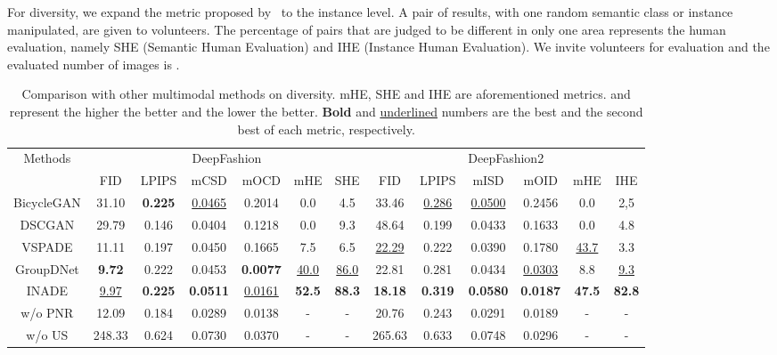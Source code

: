 \documentclass[final]{cvpr}
\begin{document}
For diversity, we expand the metric proposed by~\cite{zhu2020semantically} to the instance level. A pair of results, with one random semantic class or instance manipulated, are given to volunteers. The percentage of pairs that are judged to be different in only one area represents the human evaluation, namely SHE (Semantic Human Evaluation) and IHE (Instance Human Evaluation). We invite  volunteers for evaluation and the evaluated number of images is .


\begin{table*}[t]
\setlength{\tabcolsep}{1.6mm}
    \centering
    \caption{Comparison with other multimodal methods on diversity. mHE, SHE and IHE are aforementioned metrics.
     and  represent the higher the better and the lower the better. \textbf{Bold} and \underline{underlined} numbers are the best and the second best of each metric, respectively.}
    \small
    \begin{tabular}{c|c|c|c|c|c|c|c|c|c|c|c|c}
    \hline
        \multirow{2}{*}{Methods} & \multicolumn{6}{c|}{DeepFashion} & \multicolumn{6}{c}{DeepFashion2}\\
        \cline{2-13}
         & FID  & LPIPS  & mCSD  & mOCD  & mHE  & SHE  & FID  & LPIPS  & mISD  & mOID  & mHE  & IHE \\
        \hline
        BicycleGAN & 31.10 & \textbf{0.225} & \underline{0.0465} & 0.2014 & 0.0 & 4.5 & 33.46 & \underline{0.286} & \underline{0.0500} & 0.2456 & 0.0 & 2,5\\
        \hline
        DSCGAN & 29.79 & 0.146 & 0.0404 & 0.1218 & 0.0 & 9.3 & 48.64 & 0.199 & 0.0433 & 0.1633 & 0.0 & 4.8\\
        \hline
        VSPADE & 11.11 & 0.197 & 0.0450 & 0.1665 & 7.5 & 6.5 & \underline{22.29} & 0.222 & 0.0390 & 0.1780 & \underline{43.7} & 3.3\\
        \hline
        GroupDNet & \textbf{9.72} & 0.222 & 0.0453 & \textbf{0.0077} & \underline{40.0} & \underline{86.0} & 22.81 & 0.281 & 0.0434 & \underline{0.0303} & 8.8 & \underline{9.3}\\
        \hline
        INADE & \underline{9.97} & \textbf{0.225} & \textbf{0.0511} & \underline{0.0161} & \textbf{52.5} & \textbf{88.3} & \textbf{18.18} & \textbf{0.319} & \textbf{0.0580} & \textbf{0.0187} & \textbf{47.5} & \textbf{82.8}\\
        \hline
        \hline
        w/o PNR & 12.09 & 0.184 & 0.0289 & 0.0138 & - & - & 20.76 & 0.243 & 0.0291 & 0.0189 & - & -\\
        \hline
        w/o US & 248.33 & 0.624 & 0.0730 & 0.0370 & - & - & 265.63 & 0.633 & 0.0748 & 0.0296 & - & -\\
        \hline
    \end{tabular}
    \label{tab:comp_diversity}
\end{table*}{}
\end{document}
